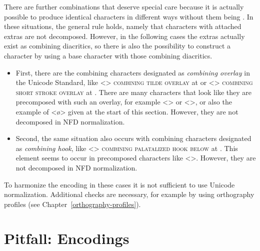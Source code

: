 There are further combinations that deserve special care because it is actually
possible to produce identical characters in different ways without them being
. In these situations, the general rule holds, namely that
characters with attached extras are not decomposed. However, in the following
cases the extras actually exist as combining diacritics, so there is also 
the possibility to construct a character by using a base character with those 
combining diacritics.

\begin{itemize}
  
  \item First, there are the combining characters designated as \textit{combining
        overlay} in the Unicode Standard, like <>
        \textsc{combining tilde overlay} at  or <>
        \textsc{combining short stroke overlay} at . There are many
        characters that look like they are precomposed with such an overlay,
        for example <> or <>, or also the
        example of <ø> given at the start of this section. However, they are 
        not decomposed in NFD normalization.
  \item Second, the same situation also occurs with combining characters
        designated as \textit{combining hook}, like 
        <{}> \textsc{combining
        palatalized hook below} at . This element seems to occur in
        precomposed characters like <>. However, they are 
        not decomposed in NFD normalization.
        
\end{itemize}

To harmonize the encoding in these cases it is not sufficient to use Unicode 
normalization. Additional checks are necessary, for example by using orthography 
profiles (see Chapter~\ref{orthography-profiles}).


\section{Pitfall: Encodings}
\label{encodings}


